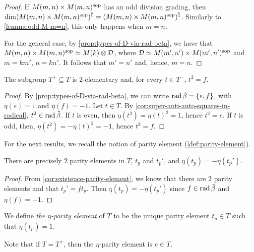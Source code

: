 \begin{proof}
    If $M(m,n) \times M(m,n)^{\mathrm{sop}}$ has an odd division grading, then $\dim (M(m,n) \times M(m,n)^{\mathrm{sop}})^{\bar0} = (M(m,n) \times M(m,n)^{\mathrm{sop}})^{\bar1}$. 
    Similarly to \cref{lemma:odd-M-m=n}, this only happens when $m = n$. 
    
    For the general case, by \cref{prop:types-of-D-via-rad-beta}, we have that $M(m,n) \times M(m,n)^{\mathrm{sop}} \simeq M(k) \otimes \mathcal{D}$, where $\mathcal{D} \simeq M(m',n') \times M(m',n')^{\mathrm{sop}}$ and $m = km'$, $n = kn'$. 
    It follows that $m' = n'$ and, hence, $m = n$. 
\end{proof}

\begin{cor}\label{cor:T+-is-elem-2-grp}
    The subgroup $T^+ \subseteq T$ is $2$-elementary and, for every $t\in T^-$, $t^2 = f$. 
\end{cor}

\begin{proof}
	By \cref{prop:types-of-D-via-rad-beta}, we can write $\operatorname{rad} \tilde\beta = \{ e, f\}$, with $\eta(e) = 1$ and $\eta(f) = -1$.  
	Let $t\in T$. 
	By \cref{cor:super-anti-auto-squares-in-radical}, $t^2 \in \operatorname{rad}\tilde\beta$. 
	If $t$ is even, then $\eta(t^2) = \eta(t)^2 = 1$, hence $t^2 = e$.
	If $t$ is odd, then, $\eta(t^2) = -\eta(t)^2 = -1$, hence $t^2 = f$. 
\end{proof}

For the next results, we recall the notion of parity element (\cref{def:parity-element}). 

\begin{cor}\label{cor:eta-parity-element}
    There are precisely $2$ parity elements in $T$, $t_p$ and $t_p'$, and $\eta(t_p) = - \eta(t_p')$. 
\end{cor}

\begin{proof}
    From \cref{cor:existence-parity-element}, we know that there are $2$ parity elements and that $t_p' = f t_p$. 
    Then $\eta(t_p) = - \eta(t_p')$ since $f\in \operatorname{rad} \tilde\beta$ and $\eta(f) = -1$. 
\end{proof}


\begin{defi}\label{def:eta-parity-element}
    We define \emph{the $\eta$-parity element} of $T$ to be the unique parity element $t_p \in T$ such that $\eta(t_p) = 1$. 
\end{defi}

Note that if $T = T^+$, then the $\eta$-parity element is $e \in T$. 

